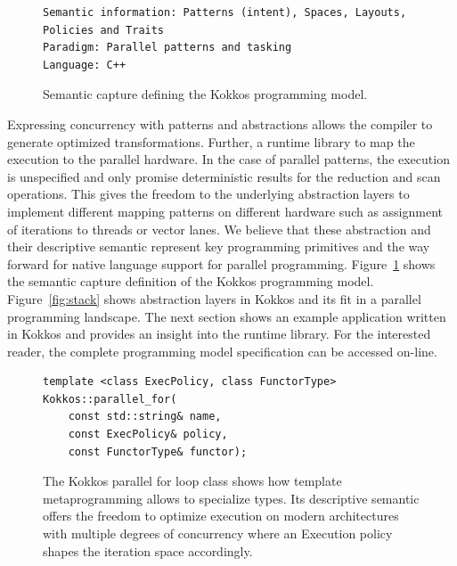 \begin{figure}[h]
\begin{Verbatim}[frame=leftline]
Semantic information: Patterns (intent), Spaces, Layouts, 
Policies and Traits
Paradigm: Parallel patterns and tasking
Language: C++
\end{Verbatim}
\caption{Semantic capture defining the Kokkos programming model.}
\label{fig:SemCaptureKokkos}
\end{figure}

Expressing concurrency with patterns and abstractions allows the compiler to generate optimized transformations. Further, a runtime library to map the execution to the parallel hardware. In the case of parallel patterns, the execution is unspecified and only promise deterministic results for the reduction and scan operations. This gives the freedom to the underlying abstraction layers to implement different mapping patterns on different hardware such as assignment of iterations to threads or vector lanes. We believe that these abstraction and their descriptive semantic represent key programming primitives and the way forward for native language support for parallel programming.
Figure~\ref{fig:SemCaptureKokkos} shows the semantic capture definition of the Kokkos programming model. 
Figure~\ref{fig:stack} shows abstraction layers in Kokkos and its fit in a parallel programming landscape.
The next section shows an example application written in Kokkos and provides an insight into the runtime library. For the interested reader, the complete programming model specification can be accessed on-line\cite{pub:KOKKOS}.

\begin{figure}
\begin{Verbatim}[frame=leftline]
template <class ExecPolicy, class FunctorType>
Kokkos::parallel_for(
    const std::string& name, 
    const ExecPolicy& policy, 
    const FunctorType& functor);
\end{Verbatim}
\caption{The Kokkos parallel for loop class shows how template metaprogramming allows to specialize types. Its descriptive semantic offers the freedom to optimize execution on modern architectures with multiple degrees of concurrency where an Execution policy shapes the iteration space accordingly.}
\label{fig:parallelForKokkos}
\end{figure}


